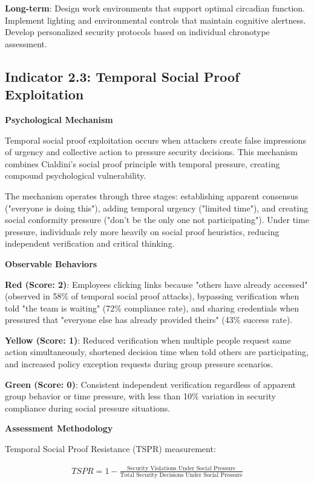 \documentclass[11pt,a4paper]{article}
\begin{document}
\textbf{Long-term}: Design work environments that support optimal circadian function. Implement lighting and environmental controls that maintain cognitive alertness. Develop personalized security protocols based on individual chronotype assessment.

\subsection{Indicator 2.3: Temporal Social Proof Exploitation}

\textbf{Psychological Mechanism}

Temporal social proof exploitation occurs when attackers create false impressions of urgency and collective action to pressure security decisions. This mechanism combines Cialdini's social proof principle with temporal pressure, creating compound psychological vulnerability.

The mechanism operates through three stages: establishing apparent consensus ("everyone is doing this"), adding temporal urgency ("limited time"), and creating social conformity pressure ("don't be the only one not participating"). Under time pressure, individuals rely more heavily on social proof heuristics, reducing independent verification and critical thinking.

\textbf{Observable Behaviors}

\textbf{Red (Score: 2)}: Employees clicking links because "others have already accessed" (observed in 58\% of temporal social proof attacks), bypassing verification when told "the team is waiting" (72\% compliance rate), and sharing credentials when pressured that "everyone else has already provided theirs" (43\% success rate).

\textbf{Yellow (Score: 1)}: Reduced verification when multiple people request same action simultaneously, shortened decision time when told others are participating, and increased policy exception requests during group pressure scenarios.

\textbf{Green (Score: 0)}: Consistent independent verification regardless of apparent group behavior or time pressure, with less than 10\% variation in security compliance during social pressure situations.

\textbf{Assessment Methodology}

Temporal Social Proof Resistance (TSPR) measurement:

\begin{align}
TSPR = 1 - \frac{\text{Security Violations Under Social Pressure}}{\text{Total Security Decisions Under Social Pressure}}
\end{align}
\end{document}
